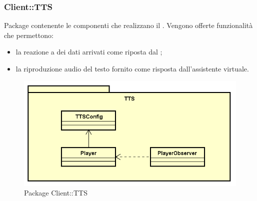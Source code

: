 \newpage
\subsubsection{Client::TTS}
Package contenente le componenti che realizzano il .
Vengono offerte funzionalità che permettono:
\begin{itemize}
\item la reazione a dei dati arrivati come riposta dal ;
\item la riproduzione audio del testo fornito come risposta dall'assistente virtuale.
\end{itemize}
\begin{figure}[h] \centering \includegraphics[width=\textwidth,height=\textheight,keepaspectratio]{images/diagrams/client/Client/TTS.png}
	\caption{Package Client::TTS}
\end{figure}
\newpage


